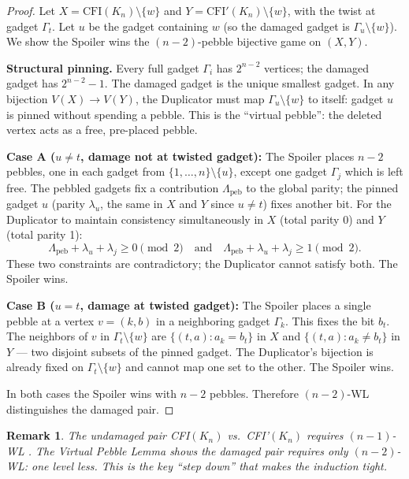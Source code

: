 \documentclass[11pt,a4paper]{article}
\newtheorem{remark}[theorem]{Remark}
\begin{document}
\begin{proof}
Let $X = \text{CFI}(K_n) \setminus \{w\}$ and $Y = \text{CFI}'(K_n) \setminus \{w\}$, with the twist at gadget $\Gamma_t$. Let $u$ be the gadget containing $w$ (so the damaged gadget is $\Gamma_u \setminus \{w\}$). We show the Spoiler wins the $(n{-}2)$-pebble bijective game on $(X, Y)$.

\textbf{Structural pinning.} Every full gadget $\Gamma_i$ has $2^{n-2}$ vertices; the damaged gadget has $2^{n-2} - 1$. The damaged gadget is the unique smallest gadget. In any bijection $V(X) \to V(Y)$, the Duplicator must map $\Gamma_u \setminus \{w\}$ to itself: gadget $u$ is pinned without spending a pebble. This is the ``virtual pebble'': the deleted vertex acts as a free, pre-placed pebble.

\textbf{Case A ($u \neq t$, damage not at twisted gadget):} The Spoiler places $n{-}2$ pebbles, one in each gadget from $\{1,\ldots,n\} \setminus \{u\}$, except one gadget $\Gamma_j$ which is left free. The pebbled gadgets fix a contribution $\Lambda_{\text{peb}}$ to the global parity; the pinned gadget $u$ (parity $\lambda_u$, the same in $X$ and $Y$ since $u \neq t$) fixes another bit. For the Duplicator to maintain consistency simultaneously in $X$ (total parity 0) and $Y$ (total parity 1):
\[
\Lambda_{\text{peb}} + \lambda_u + \lambda_j \geq 0 \pmod{2} \quad \text{and} \quad \Lambda_{\text{peb}} + \lambda_u + \lambda_j \geq 1 \pmod{2}.
\]
These two constraints are contradictory; the Duplicator cannot satisfy both. The Spoiler wins.

\textbf{Case B ($u = t$, damage at twisted gadget):} The Spoiler places a single pebble at a vertex $v = (k, b)$ in a neighboring gadget $\Gamma_k$. This fixes the bit $b_t$. The neighbors of $v$ in $\Gamma_t \setminus \{w\}$ are $\{(t,a) : a_k = b_t\}$ in $X$ and $\{(t,a) : a_k \neq b_t\}$ in $Y$ — two disjoint subsets of the pinned gadget. The Duplicator's bijection is already fixed on $\Gamma_t \setminus \{w\}$ and cannot map one set to the other. The Spoiler wins.

In both cases the Spoiler wins with $n-2$ pebbles. Therefore $(n-2)$-WL distinguishes the damaged pair.
\end{proof}

\begin{remark}
The undamaged pair CFI$(K_n)$ vs.\ CFI'$(K_n)$ requires $(n-1)$-WL \cite{cai1992optimal}. The Virtual Pebble Lemma shows the damaged pair requires only $(n-2)$-WL: one level less. This is the key ``step down'' that makes the induction tight.
\end{remark}
\end{document}
